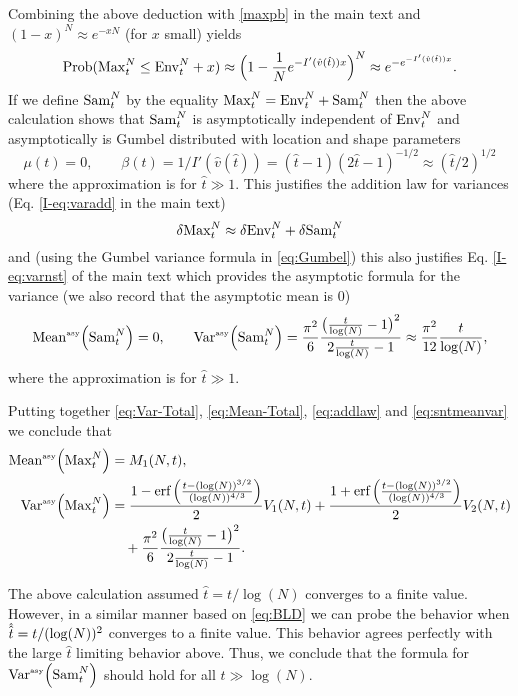 Combining the above deduction with \eqref{maxpb} in the main text and  $(1-x)^N\approx e^{-xN}$ (for $x$ small) yields
\begin{equation}\label{eq:SNT}
\mathrm{Prob}(\mathrm{Max}^{N}_t\leq \mathrm{Env}^{N}_t + x) \approx \Big(1-\frac{1}{N}  e^{-I'(\hat{v}(\hat{t}))x}\Big)^{N}
\approx e^{-e^{-I'(\hat{v}(\hat{t}))x}}.
\end{equation}
If we define $\mathrm{Sam}^{N}_t$ by the equality $\mathrm{Max}^{N}_t=\mathrm{Env}^{N}_t+\mathrm{Sam}^{N}_t$ then the above calculation shows that $\mathrm{Sam}^{N}_t$ is asymptotically independent of $\mathrm{Env}^{N}_t$ and asymptotically is Gumbel distributed with location and shape parameters
$$\mu(t)=0,\qquad \beta(t)=1/I'(\hat{v}(\hat{t})) = (\hat{t}-1)(2\hat{t}-1)^{-1/2}\approx (\hat t/2)^{1/2}$$
where the approximation is for $\hat{t}\gg 1$. This justifies the addition law for variances (Eq. \eqref{I-eq:varadd} in the main text)
\begin{equation}\label{eq:addlaw}
\var{\mathrm{Max}^{N}_t}\approx \var{\mathrm{Env}^{N}_t}+\var{\mathrm{Sam}^{N}_t}
\end{equation}
and (using the Gumbel variance formula in \eqref{eq:Gumbel}) this also justifies Eq. \eqref{I-eq:varnst} of the main text which provides the asymptotic formula for the variance (we also record that the asymptotic mean is 0)
\begin{equation}\label{eq:sntmeanvar}
\mathrm{Mean}^{\textrm{\tiny{asy}}}\!\left(\mathrm{Sam}^{N}_t\right) =0,\qquad \mathrm{Var}^{\textrm{\tiny{asy}}}\!\left(\mathrm{Sam}^{N}_t\right) = \frac{\pi^2}{6} \frac{\big(\frac{t}{\log(N)} -1\big)^2}{2\frac{t}{\log(N)} -1}\approx \frac{\pi^2}{12} \frac{t}{\log(N)},
\end{equation}
where the approximation is for $\hat{t}\gg 1$.

Putting together  \eqref{eq:Var-Total}, \eqref{eq:Mean-Total}, \eqref{eq:addlaw} and \eqref{eq:sntmeanvar} we conclude that
\begin{align}
\begin{split}
\label{eq:Var-Totalmaxnt}
\mathrm{Mean}^{\textrm{\tiny{asy}}}\!\left(\mathrm{Max}^{N}_t\right) &= M_1(N,t),\\
\mathrm{Var}^{\textrm{\tiny{asy}}}\!\left(\mathrm{Max}^{N}_t\right) &= \frac{1-\text{erf}\left(\tfrac{t-(\log(N))^{3/2}}{(\log(N))^{4/3}}\right)}{2} V_1(N,t)+ \frac{1+\text{erf}\left(\tfrac{t-(\log(N))^{3/2}}{(\log(N))^{4/3}}\right)}{2}V_2(N,t)\\&\quad+ \frac{\pi^2}{6} \frac{\big(\frac{t}{\log(N)} -1\big)^2}{2\frac{t}{\log(N)} -1}.
\end{split}
\end{align}

The above calculation assumed $\hat{t}=t/ \log(N)$ converges to a finite value. However, in a similar manner based on \eqref{eq:BLD} we can probe the behavior when $\hathat{t}= t/(\log(N))^2$ converges to a finite value. This behavior agrees perfectly with the large $\hat{t}$ limiting behavior above. Thus, we conclude that the formula for $\mathrm{Var}^{\textrm{\tiny{asy}}}\!\left(\mathrm{Sam}^{N}_t\right)$ should hold for all $t\gg \log(N)$.


